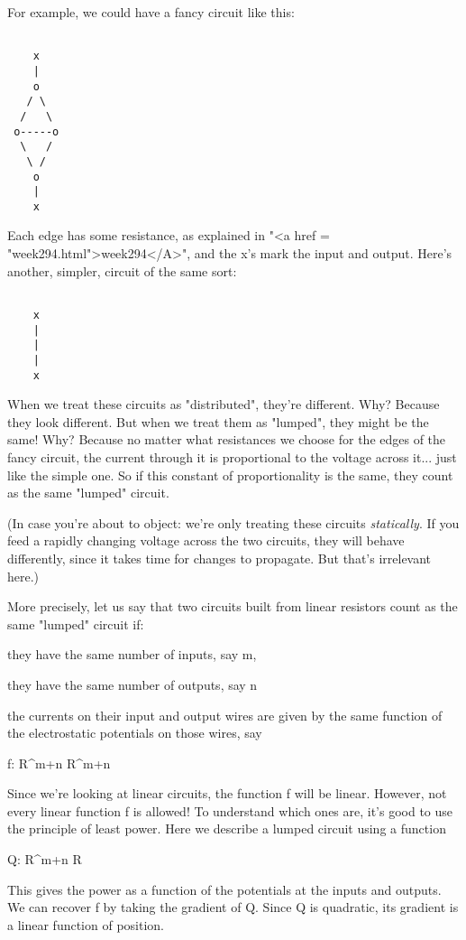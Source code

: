 For example, we could have a fancy circuit like this:


\begin{verbatim}

    x
    |
    o
   / \
  /   \
 o-----o
  \   /
   \ /
    o
    |
    x
\end{verbatim}
    

Each edge has some resistance, as explained in "<a href =
"week294.html">week294</A>", and the x's mark the input and
output.  Here's another, simpler, circuit of the same sort:


\begin{verbatim}

    x
    |
    |
    |
    x
\end{verbatim}
    

When we treat these circuits as "distributed", they're different.
Why?  Because they look different.  But when we treat them as
"lumped", they might be the same!  Why?  Because no matter what
resistances we choose for the edges of the fancy circuit, the current
through it is proportional to the voltage across it... just like the
simple one.  So if this constant of proportionality is the same, they
count as the same "lumped" circuit.

(In case you're about to object: we're only treating these circuits
\emph{statically}.  If you feed a rapidly changing voltage across the two
circuits, they will behave differently, since it takes time for
changes to propagate.  But that's irrelevant here.)

More precisely, let us say that two circuits built from linear
resistors count as the same "lumped" circuit if:

   they have the same number of inputs, say m,

   they have the same number of outputs, say n

   the currents on their input and output wires are given by the 
   same function of the electrostatic potentials on those wires,
   say

   f: R^{m+n}  \to  R^{m+n}

Since we're looking at linear circuits, the function f will be linear.
However, not every linear function f is allowed!  To understand which
ones are, it's good to use the principle of least power.  Here we 
describe a lumped circuit using a function

Q: R^{m+n} \to  R 

This gives the power as a function of the potentials at the inputs and
outputs.  We can recover f by taking the gradient of Q.  Since Q is
quadratic, its gradient is a linear function of position.

